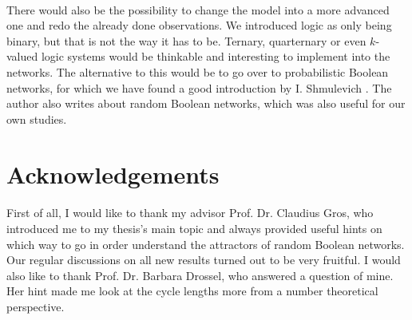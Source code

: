 \paragraph*{}
There would also be the possibility to change the model into a more advanced one and redo the already done observations. We introduced logic as only being binary, but that is not the way it has to be. Ternary, quarternary or even $k$-valued logic systems would be thinkable and interesting to implement into the networks. The alternative to this would be to go over to probabilistic Boolean networks, for which we have found a good introduction by I. Shmulevich \cite{shmulevich2010probabilistic}. The author also writes about random Boolean networks, which was also useful for our own studies.

\section{Acknowledgements}
\paragraph*{}
First of all, I would like to thank my advisor Prof. Dr. Claudius Gros, who introduced me to my thesis's main topic and always provided useful hints on which way to go in order understand the attractors of random Boolean networks. Our regular discussions on all new results turned out to be very fruitful. I would also like to thank Prof. Dr. Barbara Drossel, who answered a question of mine. Her hint made me look at the cycle lengths more from a number theoretical perspective.
